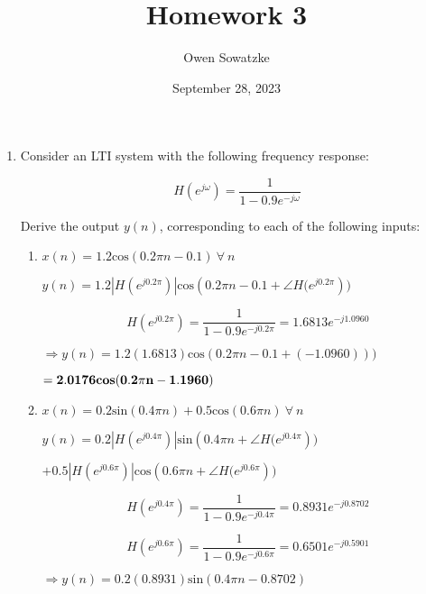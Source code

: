 \documentclass[fleqn]{article}
\title{Homework 3}
\author{Owen Sowatzke}
\date{September 28, 2023}
\makeatletter
\newcommand{\zerodisplayskip}{
	\setlength{\abovedisplayskip}{0pt}%
	\setlength{\belowdisplayskip}{0pt}%
	\setlength{\abovedisplayshortskip}{0pt}%
	\setlength{\belowdisplayshortskip}{0pt}%
	\setlength{\mathindent}{0pt}}
\newenvironment{equationCenter}{\@fleqnfalse\begin{equation*}}{\end{equation*}}
\makeatother
\begin{document}
	\offinterlineskip
	\setlength{\lineskip}{12pt}
	\zerodisplayskip
	\maketitle
	
	\begin{enumerate}[nolistsep]
		\item Consider an LTI system with the following frequency response:
		
		\begin{equationCenter}
			H(e^{j\omega}) = \frac{1}{1 - 0.9e^{-j\omega}}
		\end{equationCenter}
		
		Derive the output $y(n)$, corresponding to each of the following inputs:
		
		\begin{enumerate}[nolistsep]	
			\item $x(n) = 1.2\text{cos}(0.2{\pi}n - 0.1)\ \forall\ n$
				
				$y(n) = 1.2|H(e^{j0.2\pi})|\text{cos}(0.2{\pi}n - 0.1 + \angle{H(e^{j0.2\pi}}))$
				
				\begin{equation*}
					H(e^{j0.2\pi}) = \frac{1}{1-0.9e^{-j0.2\pi}} = 1.6813e^{-j1.0960}
				\end{equation*}
				
				$\Rightarrow y(n) = 1.2(1.6813)\text{cos}(0.2{\pi}n - 0.1 + (-1.0960)))$
				
				$\mathbf{= 2.0176\text{\textbf{cos}}(0.2{\pi}n - 1.1960)}$
				
			\item $x(n) = 0.2\text{sin}(0.4{\pi}n) + 0.5\text{cos}(0.6{\pi}n)\ \forall\ n$
			
				$y(n) = 0.2|H(e^{j0.4\pi})|\text{sin}(0.4{\pi}n + \angle{H(e^{j0.4\pi}}))$
				
				$ + 0.5|H(e^{j0.6\pi})|\text{cos}(0.6{\pi}n + \angle{H(e^{j0.6\pi}}))$
				
				\begin{equation*}
					H(e^{j0.4\pi}) = \frac{1}{1-0.9e^{-j0.4\pi}} = 0.8931e^{-j0.8702}
				\end{equation*}
				
				\begin{equation*}
					H(e^{j0.6\pi}) = \frac{1}{1-0.9e^{-j0.6\pi}} = 0.6501e^{-j0.5901}
				\end{equation*}
				
				$\Rightarrow y(n) = 0.2(0.8931)\text{sin}(0.4{\pi}n - 0.8702)$
				

\end{enumerate}
\end{enumerate}
\end{document}
